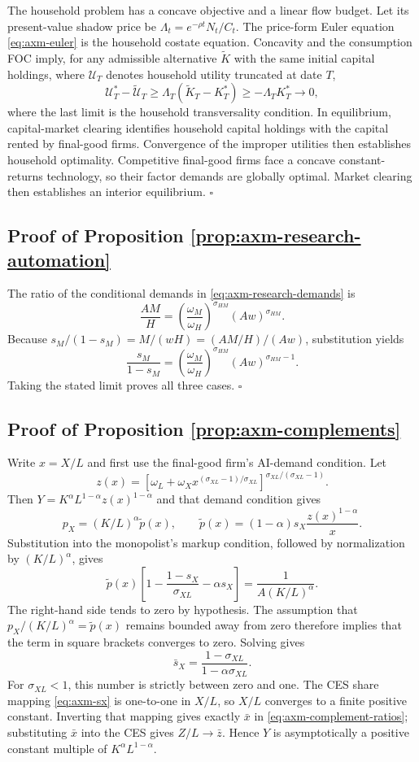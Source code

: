 The household problem has a concave objective and a linear flow budget.
Let its present-value shadow price be
\(\Lambda_t=e^{-\rho t}N_t/C_t\). The price-form Euler equation
\eqref{eq:axm-euler} is the household costate equation. Concavity and the
consumption FOC imply, for any admissible alternative \(\widetilde K\) with the
same initial capital holdings, where \(\mathcal U_T\) denotes
household utility truncated at date \(T\),
\[
 \mathcal U_T^*-\widetilde{\mathcal U}_T
 \geq \Lambda_T(\widetilde K_T-K_T^*)
 \geq-\Lambda_TK_T^*\to0,
\]
where the last limit is the household transversality condition. In equilibrium,
capital-market clearing identifies household capital holdings with the capital
rented by final-good firms. Convergence of
the improper utilities then establishes household optimality. Competitive
final-good firms face a concave constant-returns technology, so their factor
demands are globally optimal. Market clearing then establishes an interior
equilibrium. \(\square\)

\subsection{Proof of Proposition \ref{prop:axm-research-automation}}

The ratio of the conditional demands in \eqref{eq:axm-research-demands} is
\[
 \frac{AM}{H}
 =\left(\frac{\omega_M}{\omega_H}\right)^{\sigma_{HM}}
  (Aw)^{\sigma_{HM}}.
\]
Because \(s_M/(1-s_M)=M/(wH)=(AM/H)/(Aw)\), substitution yields
\[
 \frac{s_M}{1-s_M}
 =\left(\frac{\omega_M}{\omega_H}\right)^{\sigma_{HM}}
  (Aw)^{\sigma_{HM}-1}.
\]
Taking the stated limit proves all three cases. \(\square\)

\subsection{Proof of Proposition \ref{prop:axm-complements}}

Write \(x=X/L\) and first use the final-good firm's AI-demand condition.
Let
\[
 z(x)=\left[\omega_L+\omega_Xx^{(\sigma_{XL}-1)/\sigma_{XL}}
 \right]^{\sigma_{XL}/(\sigma_{XL}-1)}.
\]
Then \(Y=K^\alpha L^{1-\alpha}z(x)^{1-\alpha}\) and that demand condition gives
\[
 p_X=(K/L)^\alpha\widetilde p(x),\qquad
 \widetilde p(x)=(1-\alpha)s_X\frac{z(x)^{1-\alpha}}{x}.
\]
Substitution into the monopolist's markup condition, followed by normalization
by \((K/L)^\alpha\), gives
\[
 \widetilde p(x)
 \left[1-\frac{1-s_X}{\sigma_{XL}}-\alpha s_X\right]
 =\frac{1}{A(K/L)^\alpha}.
\]
The right-hand side tends to zero by hypothesis. The assumption that
\(p_X/(K/L)^\alpha=\widetilde p(x)\) remains bounded away from zero therefore
implies that the term in square brackets converges to zero. Solving gives
\[
 \bar s_X=\frac{1-\sigma_{XL}}{1-\alpha\sigma_{XL}}.
\]
For \(\sigma_{XL}<1\), this number is strictly between zero and one. The CES share
mapping \eqref{eq:axm-sx} is one-to-one in \(X/L\), so \(X/L\) converges to a
finite positive constant. Inverting that mapping gives exactly \(\bar x\) in
\eqref{eq:axm-complement-ratios}; substituting \(\bar x\) into the CES gives
\(Z/L\to\bar z\). Hence \(Y\) is asymptotically a positive constant multiple
of \(K^\alpha L^{1-\alpha}\).

